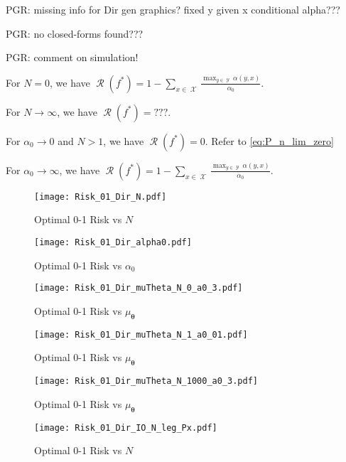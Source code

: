 \documentclass[12pt]{report}
\DeclareMathOperator{\Xcal}{\mathcal{X}}
\DeclareMathOperator{\Ycal}{\mathcal{Y}}
\DeclareMathOperator{\Rcal}{\mathcal{R}}
\begin{document}
PGR: missing info for Dir gen graphics? fixed y given x conditional alpha???

PGR: no closed-forms found???


PGR: comment on simulation!

For $N = 0$, we have $\Rcal(f^*) = 1 - \sum_{x \in \Xcal} \frac{\max_{y \in \Ycal} \alpha(y,x)}{\alpha_0}$. 

For $N \to \infty$, we have $\Rcal(f^*) = ???$.

For $\alpha_0 \to 0$ and $N > 1$, we have $\Rcal(f^*) = 0$. Refer to \ref{eq:P_n_lim_zero}

For $\alpha_0 \to \infty$, we have $\Rcal(f^*) = 1 - \sum_{x \in \Xcal} \frac{\max_{y \in \Ycal} \alpha(y,x)}{\alpha_0}$.



\begin{figure}
\centering
\texttt{[image: Risk\_01\_Dir\_N.pdf]}
\caption{Optimal 0-1 Risk vs $N$}
\label{fig:Risk_01_Dir_N}
\end{figure}

\begin{figure}
\centering
\texttt{[image: Risk\_01\_Dir\_alpha0.pdf]}
\caption{Optimal 0-1 Risk vs $\alpha_0$}
\label{fig:Risk_01_Dir_alpha0}
\end{figure}

\begin{figure}
\centering
\texttt{[image: Risk\_01\_Dir\_muTheta\_N\_0\_a0\_3.pdf]}
\caption{Optimal 0-1 Risk vs $\mu_{\bm{\theta}}$}
\label{fig:Risk_01_Dir_muTheta_N_0_a0_3}
\end{figure}

\begin{figure}
\centering
\texttt{[image: Risk\_01\_Dir\_muTheta\_N\_1\_a0\_01.pdf]}
\caption{Optimal 0-1 Risk vs $\mu_{\bm{\theta}}$}
\label{fig:Risk_01_Dir_muTheta_N_1_a0_01}
\end{figure}

\begin{figure}
\centering
\texttt{[image: Risk\_01\_Dir\_muTheta\_N\_1000\_a0\_3.pdf]}
\caption{Optimal 0-1 Risk vs $\mu_{\bm{\theta}}$}
\label{fig:Risk_01_Dir_muTheta_N_1000_a0_3}
\end{figure}


\begin{figure}
\centering
\texttt{[image: Risk\_01\_Dir\_IO\_N\_leg\_Px.pdf]}
\caption{Optimal 0-1 Risk vs $N$}
\label{fig:Risk_01_Dir_IO_N_leg_Px}
\end{figure}
\end{document}
